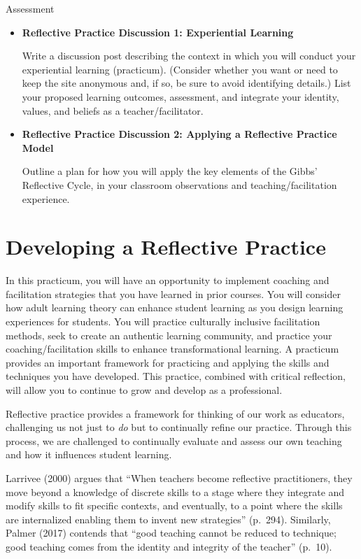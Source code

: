 \documentclass[
]{book}
\begin{document}
\begin{assessment}
{Assessment}

\begin{itemize}
\item
  \textbf{Reflective Practice Discussion 1: Experiential Learning}

  Write a discussion post describing the context in which you will conduct your experiential learning (practicum). (Consider whether you want or need to keep the site anonymous and, if so, be sure to avoid identifying details.) List your proposed learning outcomes, assessment, and integrate your identity, values, and beliefs as a teacher/facilitator.
\item
  \textbf{Reflective Practice Discussion 2: Applying a Reflective Practice Model}

  Outline a plan for how you will apply the key elements of the Gibbs' Reflective Cycle, in your classroom observations and teaching/facilitation experience.
\end{itemize}
\end{assessment}

\hypertarget{developing-a-reflective-practice-1}{%
\section{Developing a Reflective Practice}\label{developing-a-reflective-practice-1}}

In this practicum, you will have an opportunity to implement coaching and facilitation strategies that you have learned in prior courses. You will consider how adult learning theory can enhance student learning as you design learning experiences for students. You will practice culturally inclusive facilitation methods, seek to create an authentic learning community, and practice your coaching/facilitation skills to enhance transformational learning. A practicum provides an important framework for practicing and applying the skills and techniques you have developed. This practice, combined with critical reflection, will allow you to continue to grow and develop as a professional.

Reflective practice provides a framework for thinking of our work as educators, challenging us not just to \emph{do} but to continually refine our practice. Through this process, we are challenged to continually evaluate and assess our own teaching and how it influences student learning.

Larrivee (2000) argues that ``When teachers become reflective practitioners, they move beyond a knowledge of discrete skills to a stage where they integrate and modify skills to fit specific contexts, and eventually, to a point where the skills are internalized enabling them to invent new strategies'' (p.~294). Similarly, Palmer (2017) contends that ``good teaching cannot be reduced to technique; good teaching comes from the identity and integrity of the teacher'' (p.~10).
\end{document}
